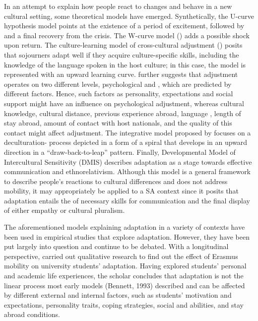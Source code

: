 \documentclass[output=paper]{langsci/langscibook}
\begin{document}
In an attempt to explain how people react to changes and behave in a new cultural setting, some theoretical models have emerged. Synthetically, the U-curve hypothesis model \citep{Lysgaard1955} points at the existence of a period of excitement, followed by  and a final recovery from the crisis. The W-curve model (\citealt{GullahornGullahorn1963}) adds a possible shock upon return. The culture-learning model of cross-cultural adjustment (\citealt{Ward2004,MasgoretWard2006}) posits that sojourners adapt well if they acquire culture-specific skills, including the knowledge of the language spoken in the host culture; in this case, the model is represented with an upward learning curve. \citet{Ward2004} further suggests that adjustment operates on two different levels, psychological and , which are predicted by different factors. Hence, such factors as personality, expectations and social support might have an influence on psychological adjustment, whereas cultural knowledge, cultural distance, previous experience abroad, language , length of stay abroad, amount of contact with host nationals, and the quality of this contact might affect  adjustment. The integrative model proposed by \citet{Kim2005} focuses on a deculturation- process depicted in a form of a spiral that develops in an upward direction in a “draw-back-to-leap” pattern. Finally,  Developmental Model of Intercultural Sensitivity (DMIS) describes adaptation as a stage towards effective  communication and ethnorelativism. Although this model is a general framework to describe people’s reactions to cultural differences and does not address mobility, it may appropriately be applied to a SA context since it posits that adaptation entails the  of necessary skills for  communication and the final display of either empathy or cultural pluralism.

The aforementioned models explaining adaptation in a variety of contexts have been used in empirical studies that explore  adaptation. However, they have been put largely into question and continue to be debated.  With a longitudinal perspective, \citet{Beaven2012} carried out qualitative research to find out the effect of Erasmus mobility on  university students’ adaptation. Having explored students’ personal and academic life experiences, the scholar concludes that adaptation is not the linear process most early models (Bennett, 1993) described and can be affected by different external and internal factors, such as students’ motivation and expectations, personality traits, coping strategies, social and  abilities, and stay abroad conditions. 
\end{document}

